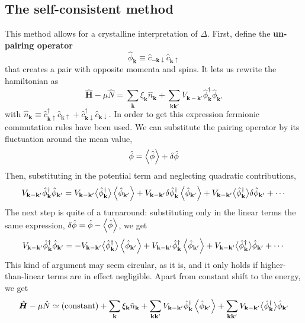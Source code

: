 \subsection{The self-consistent method}

This method allows for a crystalline interpretation of $\Delta$. First, define the \textbf{un-pairing operator}
\[
	\hat{\phi}_\mathbf{k} \equiv  \hat{c}_{-\mathbf{k}\downarrow} \hat{c}_{\mathbf{k}\uparrow}
\]
that creates a pair with opposite momenta and spins. It lets us rewrite the hamiltonian as
\[
	\hat{\bm H} - \mu\hat{N} = \sum_{\mathbf{k}} \xi_{\mathbf{k}} \hat n_\mathbf{k} + \sum_{\mathbf{k}\mathbf{k}'} V_{\mathbf{k}-\mathbf{k}'} \hat{\phi}_\mathbf{k}^\dagger \hat{\phi}_{\mathbf{k}'}
\]
with $\hat{n}_\mathbf{k} \equiv \hat{c}_{\mathbf{k}\uparrow}^\dagger \hat{c}_{\mathbf{k}\uparrow} + \hat{c}_{\mathbf{k}\downarrow}^\dagger \hat{c}_{\mathbf{k}\downarrow}$. In order to get this expression fermionic commutation rules have been used. We can substitute the pairing operator by its fluctuation around the mean value,
\[
	\hat{\phi} = \ev{\hat{\phi}} + \delta\hat{\phi}
\]
Then, substituting in the potential term and neglecting quadratic contributions,
\[
	V_{\mathbf{k}-\mathbf{k}'} \hat{\phi}_\mathbf{k}^\dagger \hat{\phi}_{\mathbf{k}'} = V_{\mathbf{k}-\mathbf{k}'}  \big\langle\hat{\phi}_\mathbf{k}^\dagger\big\rangle \ev{\hat{\phi}_{\mathbf{k}'}}
	+ V_{\mathbf{k}-\mathbf{k}'} \delta\hat{\phi}_\mathbf{k}^\dagger \ev{\hat{\phi}_{\mathbf{k}'}}
	+ V_{\mathbf{k}-\mathbf{k}'} \big\langle\hat{\phi}_\mathbf{k}^\dagger\big\rangle \delta\hat{\phi}_{\mathbf{k}'}
	+ \cdots
\]
The next step is quite of a turnaround: substituting only in the linear terms the same expression, $\delta\hat{\phi} = \hat{\phi}-\ev{\hat{\phi}}$, we get
\[
	V_{\mathbf{k}-\mathbf{k}'} \hat{\phi}_\mathbf{k}^\dagger \hat{\phi}_{\mathbf{k}'} = - V_{\mathbf{k}-\mathbf{k}'}  \big\langle\hat{\phi}_\mathbf{k}^\dagger\big\rangle \ev{\hat{\phi}_{\mathbf{k}'}}
	+ V_{\mathbf{k}-\mathbf{k}'} \hat{\phi}_\mathbf{k}^\dagger \ev{\hat{\phi}_{\mathbf{k}'}}
	+ V_{\mathbf{k}-\mathbf{k}'} \big\langle\hat{\phi}_\mathbf{k}^\dagger\big\rangle\hat{\phi}_{\mathbf{k}'}
	+ \cdots
\]
This kind of argument may seem circular, as it is, and it only holds if higher-than-linear terms are in effect negligible. Apart from constant shift to the energy, we get
\[
	\hat{\bm H} - \mu\hat{N} \simeq (\mathrm{constant}) + \sum_{\mathbf{k}} \xi_{\mathbf{k}} \hat n_\mathbf{k} + 
	\sum_{\mathbf{k}\mathbf{k}'} V_{\mathbf{k}-\mathbf{k}'} \hat{\phi}_\mathbf{k}^\dagger \ev{\hat{\phi}_{\mathbf{k}'}} + \sum_{\mathbf{k}\mathbf{k}'} V_{\mathbf{k}-\mathbf{k}'}  \big\langle\hat{\phi}_\mathbf{k}^\dagger \big\rangle \hat{\phi}_{\mathbf{k}'}
\]
